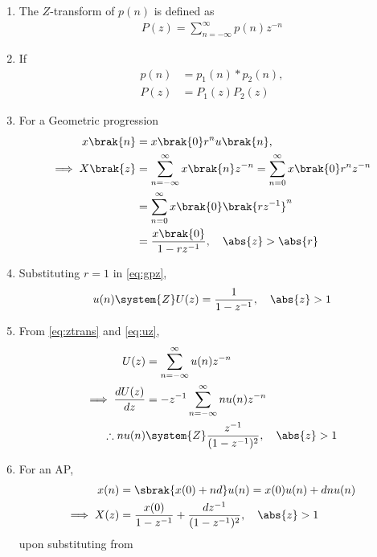 \begin{enumerate}[label=\thechapter.\arabic*,ref=\thechapter.\theenumi]
\item 
	The $Z$-transform of $p(n)$ is defined as
\begin{align}
P(z) = \sum_{n=-\infty}^{\infty}p(n)z^{-n}
\label{eq:ztrans}
\end{align}
\item If 
\begin{align}
	p(n) &= p_1(n)* p_2(n),
	\\
	P(z)&=P_1(z)P_2(z)
\label{eq:prodz}
\end{align}
\item For a Geometric progression 
\begin{align}
	       \label{eq:gpn}
	x\brak{n} &=x\brak{0}r^nu\brak{n},
	\\
         \implies      X\brak{z} &= \sum_{n=-\infty}^{\infty}x\brak{n}z^{-n}
               =\sum_{n=0}^{\infty}x\brak{0}r^nz^{-n}\\
                &=\sum_{n=0}^{\infty}x\brak{0}\brak{rz^{-1}}^n\\
               &= \frac{x\brak{0}}{1-rz^{-1}}, \quad \abs{z}>\abs{r} 
	       \label{eq:gpz}
\end{align}
\item 	       Substituting $r = 1$ in \eqref{eq:gpz},
\begin{align}
	u(n) \system{Z}	U(z) = 
                \frac{1}{1-z^{-1}}, \quad \abs{z}>1
	       \label{eq:uz}
\end{align}
\item From 
\eqref{eq:ztrans}
	       and 
	       \eqref{eq:uz},
\begin{align}
	U(z) &= \sum_{n = -\infty}^{\infty} u(n) z^{-n} 
	\\
\implies	\frac{dU(z)}{dz} &= -{z}^{-1} \sum_{n = -\infty}^{\infty} nu(n) z^{-n}\\
\therefore	nu(n) &\system{Z}\frac{z^{-1}}{(1-z^{-1})^{2}}, \quad \abs{z} > 1 
	       \label{eq:uzder}
\end{align}
\item For an AP, 
\begin{align}
	x(n) &= \sbrak{x(0) + nd} u(n) = x(0)u(n) + dnu(n)  \\
	\implies X(z) &= \frac{x(0)}{1-z^{-1}} + \frac{dz^{-1}}{(1-z^{-1})^{2}}, \quad \abs{z} > 1 
	       \label{eq:apz}
\end{align}
upon substituting from 

\end{enumerate}
